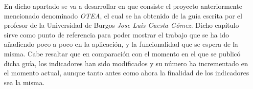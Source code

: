 
En dicho apartado se va a desarrollar en que consiste el proyecto anteriormente
mencionado denominado \textit{OTEA}, el cual se ha obtenido de la guía escrita
por el profesor de la Universidad de Burgos \textit{Jose Luis Cuesta Gómez.}
Dicho capítulo sirve como punto de referencia para poder mostrar el trabajo que
se ha ido añadiendo poco a poco en la aplicación, y la funcionalidad que se
espera de la misma. Cabe resaltar que en comparación con el momento en el que se
publicó dicha guía, los indicadores han sido modificados y su número ha
incrementado en el momento actual, aunque tanto antes como ahora la finalidad de
los indicadores sea la misma.

